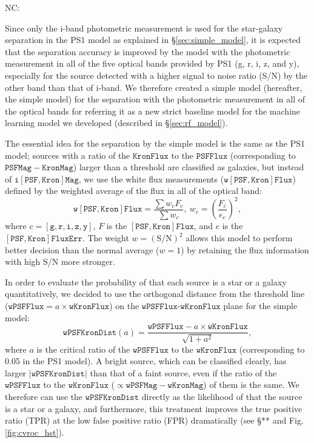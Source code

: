 \documentclass[twocolumn]{aastex62}
\newcommand{\NC}[1]{{\color{gray} NC: {#1}}}
\begin{document}
\NC{
Since only the i-band photometric measurement is used for the star-galaxy separation  
in the PS1 model as explained in \S\ref{sec:simple_model},  
it is expected that the separation accuracy is improved 
by the model with the photometric measurement in all of the five optical bands 
provided by PS1 (g, r, i, z, and y), especially for the source 
detected with a higher signal to noise ratio (S/N) by the other band than that of i-band. 
We therefore created a simple model (hereafter, the simple model) for the separation 
with the photometric measurement in all of the optical bands 
for referring it as a new strict baseline model for the machine learning model  
we developed (described in \S\ref{sec:rf_model}).

The essential idea for the separation by the simple model is the same as the PS1 model;  
sources with a ratio of the $\mathtt{KronFlux}$ to the $\mathtt{PSFFlux}$ 
(corresponding to $\mathtt{PSFMag} - \mathtt{KronMag}$) larger than a threshold 
are classified as galaxies, 
but instead of $\mathtt{i[PSF, Kron]Mag}$,  
we use the white flux measurements ($\mathtt{w[PSF,Kron]Flux}$) 
defined by the weighted average of the flux in all of the optical band:   
$$
\mathtt{w[PSF, Kron]Flux} =  \frac{\sum w_c  F_c }{\sum w_c}, 
\ w_c = \left( \frac{F_c}{e_c} \right)^2, 
$$
where $c = [\mathtt{g, r, i, z, y}]$,  $F$ is the $\mathtt{[PSF,Kron]Flux}$, 
and $e$ is the $\mathtt{[PSF,Kron]FluxErr}$.  
The weight $w = \mathrm{(S/N)}^2$ allows this model to perform better decision 
than the normal average ($w = 1$) by retaining the flux information with high S/N more stronger. 

In order to evaluate the probability of that each source is a star or a galaxy quantitatively, 
we decided to use the orthogonal distance from the threshold line 
($\mathtt{wPSFFlux} = a\times \mathtt{wKronFlux}$) 
on the $\mathtt{wPSFFlux}$-$\mathtt{wKronFlux}$ plane for the simple model:  
$$
\mathtt{wPSFKronDist}(a) = 
	\frac{\mathtt{wPSFFlux} - a\times\mathtt{wKronFlux}}{ \sqrt{1 + a^2}}, 
$$
where $a$ is the critical ratio of the $\mathtt{wPSFFlux}$ to the $\mathtt{wKronFlux}$ 
(corresponding to 0.05 in the PS1 model). 
A bright source, which can be classified clearly, 
has larger $|\mathtt{wPSFKronDist}|$ than that of a faint source, 
even if the ratio of the $\mathtt{wPSFFlux}$ to the $\mathtt{wKronFlux} $
($\propto \mathtt{wPSFMag}  -  \mathtt{wKronMag}$) of them is the same. 
We therefore can use the $\mathtt{wPSFKronDist}$ directly 
as the likelihood of that the source is a star or a galaxy, 
and furthermore, this treatment improves the true positive ratio (TPR) 
at the low false positive ratio (FPR) dramatically (see \S*** and Fig.\ref{fig:cvroc_hst}). 

}
\end{document}
